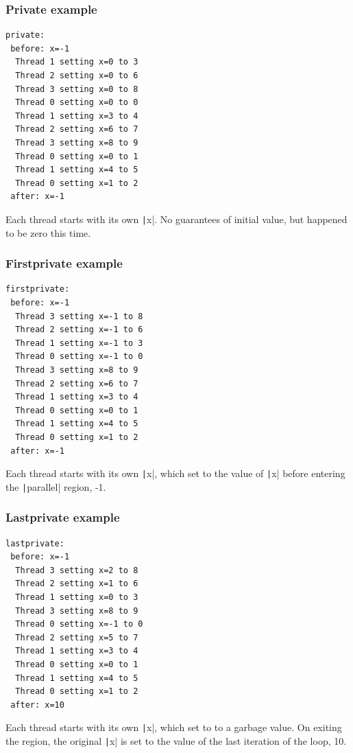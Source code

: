 \documentclass[aspectratio=169]{beamer}
\begin{document}
\begin{frame}[fragile]
\frametitle{Private example}
\begin{verbatim}
private:
 before: x=-1
  Thread 1 setting x=0 to 3
  Thread 2 setting x=0 to 6
  Thread 3 setting x=0 to 8
  Thread 0 setting x=0 to 0
  Thread 1 setting x=3 to 4
  Thread 2 setting x=6 to 7
  Thread 3 setting x=8 to 9
  Thread 0 setting x=0 to 1
  Thread 1 setting x=4 to 5
  Thread 0 setting x=1 to 2
 after: x=-1
\end{verbatim}
Each thread starts with its own \texttt|x|.
No guarantees of initial value, but happened to be zero this time.
\end{frame}

\begin{frame}[fragile]
\frametitle{Firstprivate example}
\begin{verbatim}
firstprivate:
 before: x=-1
  Thread 3 setting x=-1 to 8
  Thread 2 setting x=-1 to 6
  Thread 1 setting x=-1 to 3
  Thread 0 setting x=-1 to 0
  Thread 3 setting x=8 to 9
  Thread 2 setting x=6 to 7
  Thread 1 setting x=3 to 4
  Thread 0 setting x=0 to 1
  Thread 1 setting x=4 to 5
  Thread 0 setting x=1 to 2
 after: x=-1
\end{verbatim}
Each thread starts with its own \texttt|x|, which set to the value of \texttt|x| before entering the \texttt|parallel| region, -1.
\end{frame}

\begin{frame}[fragile]
\frametitle{Lastprivate example}
\begin{verbatim}
lastprivate:
 before: x=-1
  Thread 3 setting x=2 to 8
  Thread 2 setting x=1 to 6
  Thread 1 setting x=0 to 3
  Thread 3 setting x=8 to 9
  Thread 0 setting x=-1 to 0
  Thread 2 setting x=5 to 7
  Thread 1 setting x=3 to 4
  Thread 0 setting x=0 to 1
  Thread 1 setting x=4 to 5
  Thread 0 setting x=1 to 2
 after: x=10
\end{verbatim}
Each thread starts with its own \texttt|x|, which set to to a garbage value.
On exiting the region, the original \texttt|x| is set to the value of the last iteration of the loop, 10.
\end{frame}

\end{document}
